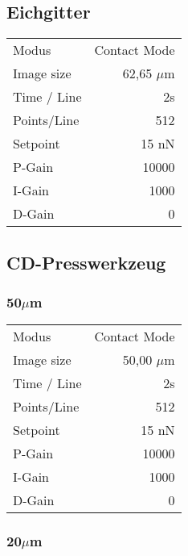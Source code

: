 \subsection{Eichgitter}
\begin{center}
    \centering
    \begin{tabular}{l|r}
        Modus & Contact Mode \\
        Image size & 62,65 $\mu$m \\
        Time / Line & 2s \\
        Points/Line & 512\\
        Setpoint & 15 nN \\
        P-Gain & 10000 \\
        I-Gain & 1000 \\
        D-Gain & 0 \\
        
    \end{tabular}
\end{center}

\subsection{CD-Presswerkzeug}
\subsubsection{50$\mu$m}
\begin{center}
    \centering
    \begin{tabular}{l|r}
        Modus & Contact Mode\\
        Image size & 50,00 $\mu$m \\
        Time / Line & 2s \\
        Points/Line & 512\\
        Setpoint & 15 nN \\
        P-Gain & 10000 \\
        I-Gain & 1000 \\
        D-Gain & 0 \\
        
    \end{tabular}
\end{center}

\subsubsection{20$\mu$m}

